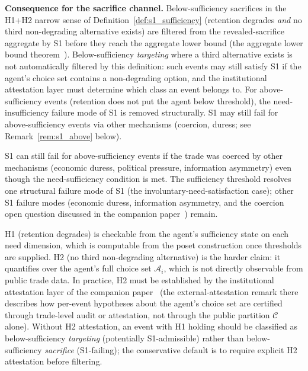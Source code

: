 \noindent\textbf{Consequence for the sacrifice channel.}
Below-sufficiency sacrifices in the H1+H2 narrow sense of
Definition~\ref{def:s1_sufficiency}
(retention degrades \emph{and} no third non-degrading
alternative exists) are filtered from the revealed-sacrifice
aggregate by S1 before they reach the aggregate lower bound
(the aggregate lower bound
theorem~\citep[Revealed~Sacrifice]{lasser2026paper8a}).  Below-sufficiency
\emph{targeting} where a third alternative exists is not
automatically filtered by this definition: such events may
still satisfy S1 if the agent's choice set contains a
non-degrading option, and the institutional attestation layer
must determine which class an event belongs to.  For
above-sufficiency events (retention does not put the agent
below threshold), the need-insufficiency failure mode of S1
is removed structurally.  S1 may still fail for
above-sufficiency events via other mechanisms (coercion,
duress; see Remark~\ref{rem:s1_above} below).

\begin{remark}
\label{rem:s1_above}
S1 can still fail for above-sufficiency events if the trade was
coerced by other mechanisms (economic duress, political pressure,
information asymmetry) even though the need-sufficiency condition
is met.  The sufficiency threshold resolves one structural failure
mode of S1 (the involuntary-need-satisfaction case); other S1
failure modes (economic duress, information asymmetry, and the
coercion open question discussed in the companion
paper~\citep[Revealed~Sacrifice]{lasser2026paper8a}) remain.
\end{remark}

\begin{remark}
\label{rem:s1_sufficiency_sourcing}
H1 (retention degrades) is checkable from the agent's
sufficiency state on each need dimension, which is computable
from the poset construction once thresholds are supplied.  H2
(no third non-degrading alternative) is the harder claim: it
quantifies over the agent's full choice set $\mathcal{A}_i$,
which is not directly observable from public trade data.  In
practice, H2 must be established by the institutional
attestation layer of the companion
paper~\citep[Revealed~Sacrifice]{lasser2026paper8a} (the external-attestation
remark there describes how per-event hypotheses about the
agent's choice set are certified through trade-level audit or
attestation, not through the public partition $\mathcal{C}$
alone).  Without H2 attestation, an event with H1 holding
should be classified as below-sufficiency \emph{targeting}
(potentially S1-admissible) rather than below-sufficiency
\emph{sacrifice} (S1-failing); the conservative default is to
require explicit H2 attestation before filtering.
\end{remark}

